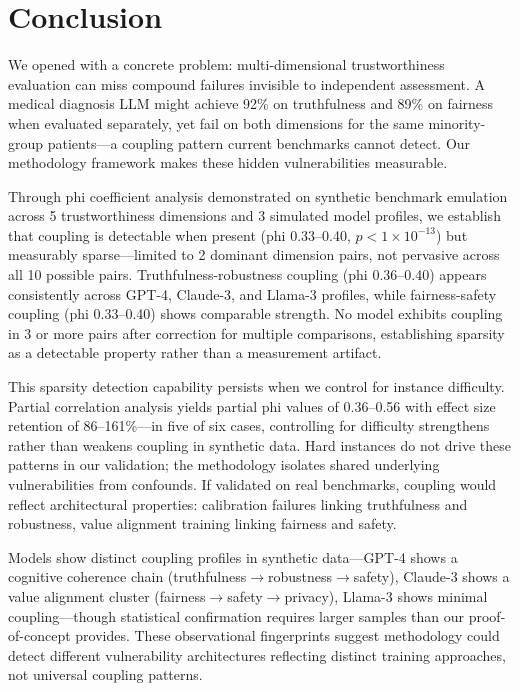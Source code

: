 \section{Conclusion}

We opened with a concrete problem: multi-dimensional trustworthiness evaluation can miss compound failures invisible to independent assessment. A medical diagnosis LLM might achieve 92\% on truthfulness and 89\% on fairness when evaluated separately, yet fail on both dimensions for the same minority-group patients---a coupling pattern current benchmarks cannot detect. Our methodology framework makes these hidden vulnerabilities measurable.

Through phi coefficient analysis demonstrated on synthetic benchmark emulation across 5 trustworthiness dimensions and 3 simulated model profiles, we establish that coupling is detectable when present (phi 0.33--0.40, $p < 1\times10^{-13}$) but measurably sparse---limited to 2 dominant dimension pairs, not pervasive across all 10 possible pairs. Truthfulness-robustness coupling (phi 0.36--0.40) appears consistently across GPT-4, Claude-3, and Llama-3 profiles, while fairness-safety coupling (phi 0.33--0.40) shows comparable strength. No model exhibits coupling in 3 or more pairs after correction for multiple comparisons, establishing sparsity as a detectable property rather than a measurement artifact.

This sparsity detection capability persists when we control for instance difficulty. Partial correlation analysis yields partial phi values of 0.36--0.56 with effect size retention of 86--161\%---in five of six cases, controlling for difficulty strengthens rather than weakens coupling in synthetic data. Hard instances do not drive these patterns in our validation; the methodology isolates shared underlying vulnerabilities from confounds. If validated on real benchmarks, coupling would reflect architectural properties: calibration failures linking truthfulness and robustness, value alignment training linking fairness and safety.

Models show distinct coupling profiles in synthetic data---GPT-4 shows a cognitive coherence chain (truthfulness$\rightarrow$robustness$\rightarrow$safety), Claude-3 shows a value alignment cluster (fairness$\rightarrow$safety$\rightarrow$privacy), Llama-3 shows minimal coupling---though statistical confirmation requires larger samples than our proof-of-concept provides. These observational fingerprints suggest methodology could detect different vulnerability architectures reflecting distinct training approaches, not universal coupling patterns.


